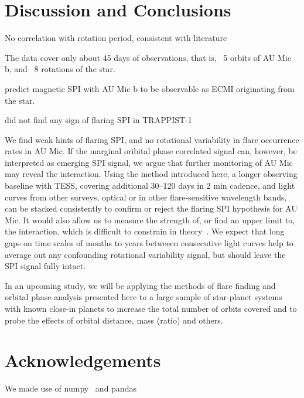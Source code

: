 \documentclass[fleqn,usenatbib,letters]{mnras}%
\begin{document}
\section{Discussion and Conclusions}
\label{sec:discussion}
No correlation with rotation period, consistent with literature~\citep{doyle2018, doyle2019}

The data cover only about 45 days of observations, that is, ~5 orbits of AU Mic b, and ~8 rotations of the star.

\citet{kavanagh2021} predict magnetic SPI with AU Mic b to be observable as ECMI originating from the star.  

\citet{fischer2019} did not find any sign of flaring SPI in TRAPPIST-1  

We find weak hints of flaring SPI, and no rotational variability in flare occurrence rates in AU Mic. If the marginal oribital phase correlated signal can, however, be interpreted as emerging SPI signal, we argue that further monitoring of AU Mic may reveal the interaction. Using the method introduced here, a longer observing baseline with TESS, covering additional 30--120 days in 2 min cadence, and light curves from other surveys, optical or in other flare-sensitive wavelength bands, can be stacked consistently to confirm or reject the flaring SPI hypothesis for AU Mic. It would also allow us to measure the strength of, or find an upper limit to, the interaction, which is difficult to constrain in theory~\citep{strugarek2019}. We expect that long gaps on time scales of months to years betweeen consecutive light curves help to average out any confounding rotational variability signal, but should leave the SPI signal fully intact.

% 

In an upcoming study, we will be applying the methods of flare finding and orbital phase analysis presented here to a large sample of star-planet systems with known close-in planets to increase the total number of orbits covered and to probe the effects of orbital distance, mass (ratio) and others.
\section*{Acknowledgements}
We made use of numpy~\citep{numpy2020} and pandas~\citep{pandas2010,pandas2020software}
\end{document}
